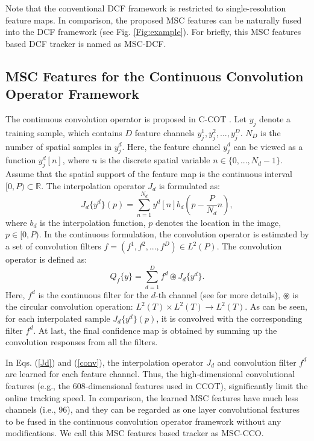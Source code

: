 \documentclass[runningheads]{llncs}
\begin{document}
Note that the conventional DCF framework is restricted to single-resolution feature maps. In comparison, the proposed MSC features can be naturally fused into the DCF framework (see Fig. \ref{Fig:example}). For briefly, this MSC features based DCF tracker is named as MSC-DCF.  %

\subsection{MSC Features for the Continuous Convolution Operator Framework}
The continuous convolution operator is proposed in C-COT \cite{CCOT}. Let $y_{j}$ denote a training sample, which contains $D$ feature channels $y_{j}^{1},y_{j}^{2}, ...,y_{j}^{D}$. $N_D$ is the number of spatial samples in $y_{j}^{d}$. Here, the feature channel $y_{j}^{d}$ can be viewed as a function $y_{j}^{d}[n]$, where $n$ is the discrete spatial variable $n\in\{0,...,N_d-1\}$. Assume that the spatial support of the feature map is the continuous interval $[0,P)\subset \mathbb{R}$. The interpolation operator $J_d$ is formulated as:
\begin{equation}\label{Jd}
J_{d}\{y^{d}\}(p) = \sum_{n=1}^{N_d}y^{d}[n]b_{d}(p-\frac{P}{N_d}n),
\end{equation}
where $b_d$ is the interpolation function, $p$ denotes the location in the image, $p\in[0, P)$. In the continuous formulation, the convolution operator is estimated by a set of convolution filters $f=(f^1, f^2,...,f^D)\in L^{2}(P)$. The convolution operator is defined as:
\begin{equation}\label{conv}
Q_{f}\{y\} = \sum_{d=1}^{D}f^{d}\circledast J_{d}\{y^{d}\}.
\end{equation}
Here, $f^d$ is the continuous filter for the $d$-th channel (see \cite{CCOT} for more details), $\circledast$ is the circular convolution operation: $L^2(T)\times L^2(T)  \rightarrow L^2(T)$. As can be seen, for each interpolated sample $J_{d}\{y^{d}\}(p)$, it is convolved with the corresponding filter $f^d$. At last, the final confidence map is obtained by summing up the convolution responses from all the filters. 

In Eqs. (\ref{Jd}) and (\ref{conv}), the interpolation operator $J_d$ and convolution filter $f^d$ are learned for each feature channel. Thus, the high-dimensional convolutional features (e.g., the 608-dimensional features used in CCOT), significantly limit the online tracking speed. In comparison, the learned MSC features have much less channels (i.e., 96), and they can be regarded as one layer convolutional features to be fused in the continuous convolution operator framework without any modifications. We call this MSC features based tracker as MSC-CCO. 
\end{document}
